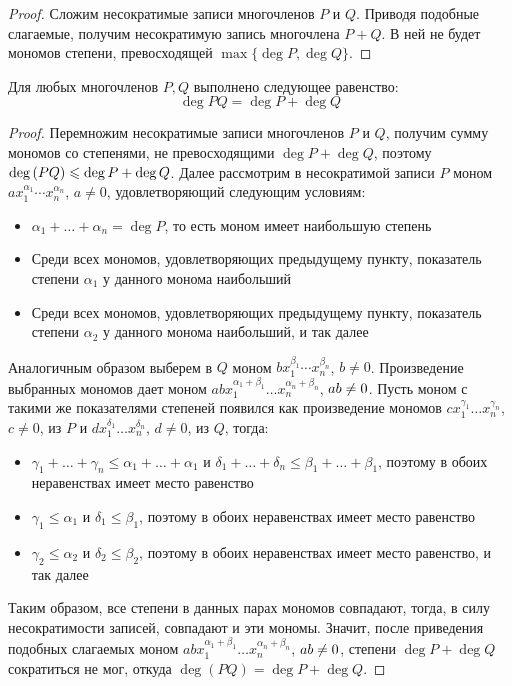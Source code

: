     \begin{proof}
    	Сложим несократимые записи многочленов $P$ и $Q$. Приводя подобные слагаемые, получим несократимую запись многочлена $P+Q$. В ней не будет мономов степени, превосходящей $\max\{\deg{P}, \deg{Q}\}$.
    \end{proof}
    
    \begin{proposition}
    	Для любых многочленов $P, Q$ выполнено следующее равенство:
    	\[\deg{PQ} = \deg{P} + \deg{Q}\]
    \end{proposition}
    
    \begin{proof}
    	Перемножим несократимые записи многочленов $P$ и $Q$, получим сумму мономов со степенями, не превосходящими $\deg{P} + \deg{Q}$, поэтому $\deg{(PQ)} \hm{\le} \deg{P} + \deg{Q}$. Далее рассмотрим в несократимой записи $P$ моном $ax_1^{\alpha_1}\dotsm x_n^{\alpha_n}$, $a \ne 0$, удовлетворяющий следующим условиям:
    	\begin{itemize}
    		\item $\alpha_1 + \dots + \alpha_n = \deg{P}$, то есть моном имеет наибольшую степень
    		\item Среди всех мономов, удовлетворяющих предыдущему пункту, показатель степени $\alpha_1$ у данного монома наибольший
    		\item Среди всех мономов, удовлетворяющих предыдущему пункту, показатель степени $\alpha_2$ у данного монома наибольший, и так далее
    	\end{itemize}
    	
    	Аналогичным образом выберем в $Q$ моном $bx_1^{\beta_1}\dotsm x_n^{\beta_n}$, $b \ne 0$. Произведение выбранных мономов дает моном $abx_1^{\alpha_1+\beta_1}\dots x_n^{\alpha_n+\beta_n}$, $ab \hm{\ne} 0$. Пусть моном с такими же показателями степеней появился как произведение мономов $cx_1^{\gamma_1}\dots x_n^{\gamma_n}$, $c \ne 0$, из $P$ и $dx_1^{\delta_1}\dots x_n^{\delta_n}$, $d \ne 0$, из $Q$, тогда:
    	\begin{itemize}
    		\item $\gamma_1 + \dots + \gamma_n \le \alpha_1 + \dots + \alpha_1$ и $\delta_1 + \dots + \delta_n \le \beta_1 + \dots + \beta_1$, поэтому в обоих неравенствах имеет место равенство
    		\item $\gamma_1 \le \alpha_1$ и $\delta_1 \le \beta_1$, поэтому в обоих неравенствах имеет место равенство
    		\item $\gamma_2 \le \alpha_2$ и $\delta_2 \le \beta_2$, поэтому в обоих неравенствах имеет место равенство, и так далее
    	\end{itemize}
    	
    	Таким образом, все степени в данных парах мономов совпадают, тогда, в силу несократимости записей, совпадают и эти мономы. Значит, после приведения подобных слагаемых моном $abx_1^{\alpha_1+\beta_1}\dots x_n^{\alpha_n+\beta_n}$, $ab \hm{\ne} 0$, степени $\deg{P} + \deg{Q}$ сократиться не мог, откуда $\deg{(PQ)} = \deg{P} + \deg{Q}$.
    \end{proof}

